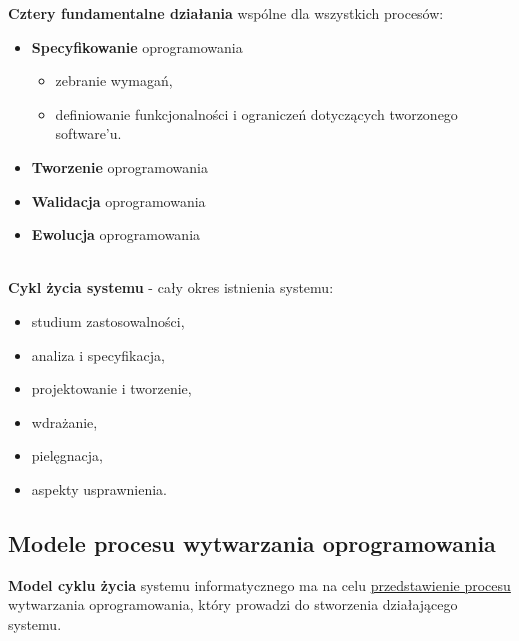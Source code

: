 \documentclass[../main.tex]{subfiles}
\begin{document}
    \textbf{Cztery fundamentalne działania }wspólne dla wszystkich procesów:
    \begin{itemize}
        \item \textbf{Specyfikowanie} oprogramowania
        \begin{itemize}
            \item zebranie wymagań,
            \item definiowanie funkcjonalności i ograniczeń dotyczących
            tworzonego software’u.
        \end{itemize}
        \item \textbf{Tworzenie} oprogramowania
        \item \textbf{Walidacja} oprogramowania
        \item \textbf{Ewolucja} oprogramowania
    \end{itemize}

    \hfill \\
    \textbf{Cykl życia systemu} - cały okres istnienia systemu:
    \begin{itemize}
        \item studium zastosowalności,
        \item analiza i specyfikacja,
        \item projektowanie i tworzenie,
        \item wdrażanie,
        \item pielęgnacja,
        \item aspekty usprawnienia.
    \end{itemize}

    \subsection{Modele procesu wytwarzania oprogramowania}
    \textbf{Model cyklu życia} systemu informatycznego ma na celu \underline{przedstawienie procesu} wytwarzania
    oprogramowania, który prowadzi do stworzenia działającego systemu.
\end{document}
